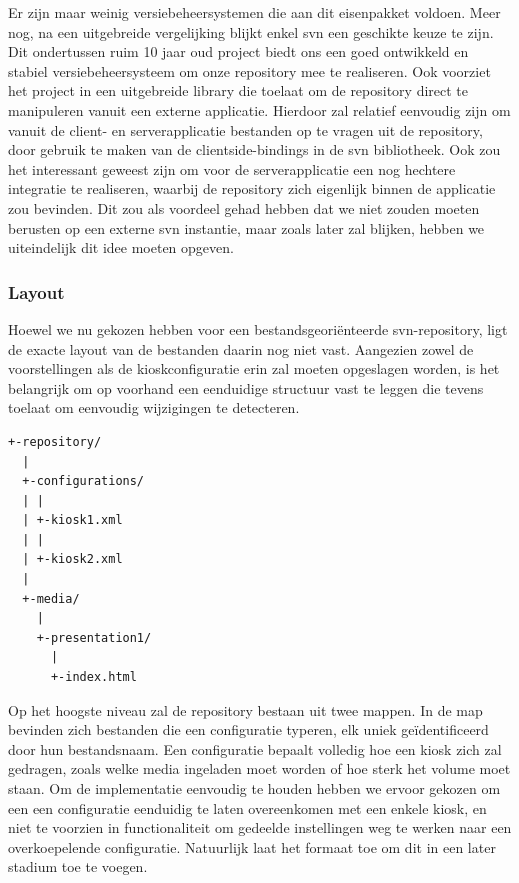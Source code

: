 Er zijn maar weinig versiebeheersystemen die aan dit eisenpakket voldoen. Meer nog, na een uitgebreide vergelijking blijkt enkel \ac{svn} een geschikte keuze te zijn. Dit ondertussen ruim 10 jaar oud project biedt ons een goed ontwikkeld en stabiel versiebeheersysteem om onze repository mee te realiseren. Ook voorziet het project in een uitgebreide library die toelaat om de repository direct te manipuleren vanuit een externe applicatie. Hierdoor zal relatief eenvoudig zijn om vanuit de client- en serverapplicatie bestanden op te vragen uit de repository, door gebruik te maken van de clientside-bindings in de \ac{svn} bibliotheek. Ook zou het interessant geweest zijn om voor de serverapplicatie een nog hechtere integratie te realiseren, waarbij de repository zich eigenlijk binnen de applicatie zou bevinden. Dit zou als voordeel gehad hebben dat we niet zouden moeten berusten op een externe \ac{svn} instantie, maar zoals later zal blijken, hebben we uiteindelijk dit idee moeten opgeven.

\subsubsection{Layout}

Hoewel we nu gekozen hebben voor een bestandsgeoriënteerde \ac{svn}-repository, ligt de exacte layout van de bestanden daarin nog niet vast. Aangezien zowel de voorstellingen als de kioskconfiguratie erin zal moeten opgeslagen worden, is het belangrijk om op voorhand een eenduidige structuur vast te leggen die tevens toelaat om eenvoudig wijzigingen te detecteren.

\begin{lstlisting}[float, caption=Voorbeeld van een repository layout.]
+-repository/
  |
  +-configurations/
  | |
  | +-kiosk1.xml
  | |
  | +-kiosk2.xml
  |
  +-media/
    |
    +-presentation1/
      |
      +-index.html
\end{lstlisting}

Op het hoogste niveau zal de repository bestaan uit twee mappen. In de  map bevinden zich bestanden die een configuratie typeren, elk uniek geïdentificeerd door hun bestandsnaam. Een configuratie bepaalt volledig hoe een kiosk zich zal gedragen, zoals welke media ingeladen moet worden of hoe sterk het volume moet staan. Om de implementatie eenvoudig te houden hebben we ervoor gekozen om een een configuratie eenduidig te laten overeenkomen met een enkele kiosk, en niet te voorzien in functionaliteit om gedeelde instellingen weg te werken naar een overkoepelende configuratie. Natuurlijk laat het formaat toe om dit in een later stadium toe te voegen.

